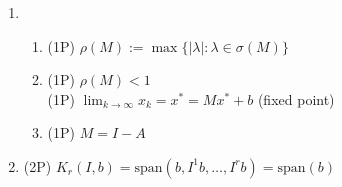 {\color{solution}
\begin{enumerate}
\item\begin{enumerate}
	\item \textcolor{exampoints}{(1P)}	 $\rho(M) := \max \{|\lambda|: \lambda \in\sigma(M)\}$
	\item \textcolor{exampoints}{(1P)} $\rho(M)<1$\\
		\textcolor{exampoints}{(1P)} $\lim_{k\to\infty}x_k = x^* = Mx^* + b$ (fixed point)
	\item \textcolor{exampoints}{(1P)} $M = I - A$
\end{enumerate}
\item \textcolor{exampoints}{(2P)} $K_r(I,b) = \text{span}(b, I^1b, \ldots, I^r b) =\text{span}(b) $
\end{enumerate}
}

